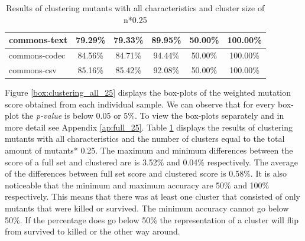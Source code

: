 \documentclass[../../main]{subfiles}
\begin{document}
\begin{table}[!htb]
\begin{tabular}{|l|c|c|c|c|c|}
commons-text                  & 79.29\%                                                                                 & 79.33\%                                                                                     & 89.95\%                                                                              & 50.00\%                                                                               & 100.00\%                                                                             \\ \hline
commons-codec                 & 84.56\%                                                                                 & 84.71\%                                                                                     & 94.44\%                                                                              & 50.00\%                                                                               & 100.00\%                                                                             \\ \hline
commons-csv                   & 85.16\%                                                                                 & 85.42\%                                                                                     & 92.08\%                                                                              & 50.00\%                                                                               & 100.00\%                                                                             \\ \hline

\end{tabular}
\caption{\label{tab:clustering_all_25}Results of clustering mutants with all characteristics and cluster size of n*0.25}
\end{table}
\FloatBarrier

Figure \ref{box:clustering_all_25} displays the box-plots of the weighted mutation score obtained from each individual sample. 
We can observe that for every box-plot the \textit{p-value} is below 0.05 or 5\%.
To view the box-plots separately and in more detail see Appendix \ref{ap:full_25}.
Table \ref{tab:clustering_all_25} displays the results of clustering mutants with all characteristics and the number of clusters equal to the total amount of mutants* 0.25.  
The maximum and minimum differences between the score of a full set and clustered are is 3.52\% and 0.04\% respectively.  
The average of the differences between full set score and clustered score is 0.58\%.
It is also noticeable that the minimum and maximum accuracy are 50\% and 100\% respectively.
This means that there was at least one cluster that consisted of only mutants that were killed or survived.
The minimum accuracy cannot go below 50\%.
If the percentage does go below 50\% the representation of a cluster will flip from survived to killed or the other way around.
\end{document}
